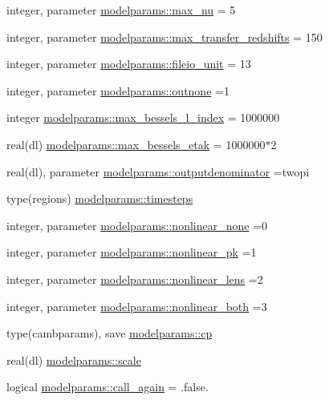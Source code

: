 \begin{DoxyCompactItemize}
\item 
integer, parameter \mbox{\hyperlink{namespacemodelparams_a5e3667fcd2aae0fb15654c207fc6830e}{modelparams\+::max\+\_\+nu}} = 5
\item 
integer, parameter \mbox{\hyperlink{namespacemodelparams_abe7b8d46cfb994afa85d77bbb5b6b5d5}{modelparams\+::max\+\_\+transfer\+\_\+redshifts}} = 150
\item 
integer, parameter \mbox{\hyperlink{namespacemodelparams_ac3257ef5df85ecef99f684ac5b101b71}{modelparams\+::fileio\+\_\+unit}} = 13
\item 
integer, parameter \mbox{\hyperlink{namespacemodelparams_a08fb4afbafc2828da55e9684f24d8d6f}{modelparams\+::outnone}} =1
\item 
integer \mbox{\hyperlink{namespacemodelparams_a0398b22cb85696d3eeaf76b7db97215c}{modelparams\+::max\+\_\+bessels\+\_\+l\+\_\+index}} = 1000000
\item 
real(dl) \mbox{\hyperlink{namespacemodelparams_a7a677586a4085c9c337cac0d8a025dc6}{modelparams\+::max\+\_\+bessels\+\_\+etak}} = 1000000$\ast$2
\item 
real(dl), parameter \mbox{\hyperlink{namespacemodelparams_abb77cb9ffb6e4c47f4bbb5817f675840}{modelparams\+::outputdenominator}} =twopi
\item 
type(regions) \mbox{\hyperlink{namespacemodelparams_ab62c122a08bce8a2c161066a3e0f83cd}{modelparams\+::timesteps}}
\item 
integer, parameter \mbox{\hyperlink{namespacemodelparams_a2e14a764fa10ffaa74cc53471510c99b}{modelparams\+::nonlinear\+\_\+none}} =0
\item 
integer, parameter \mbox{\hyperlink{namespacemodelparams_a7534d8ae818c3b810559177c3108c43c}{modelparams\+::nonlinear\+\_\+pk}} =1
\item 
integer, parameter \mbox{\hyperlink{namespacemodelparams_a0f2c57977e2bc614225a5776fbcd1efa}{modelparams\+::nonlinear\+\_\+lens}} =2
\item 
integer, parameter \mbox{\hyperlink{namespacemodelparams_a44142a84e66f3bd7d9feebe2abd22160}{modelparams\+::nonlinear\+\_\+both}} =3
\item 
type(cambparams), save \mbox{\hyperlink{namespacemodelparams_a957df29b9a56a2cfc2a8cb27d46daa2d}{modelparams\+::cp}}
\item 
real(dl) \mbox{\hyperlink{namespacemodelparams_adc3b09efaf8a6d37303ccd19e27ae6e3}{modelparams\+::scale}}
\item 
logical \mbox{\hyperlink{namespacemodelparams_a188f571d5f56be7a62bb3079ef44c3ce}{modelparams\+::call\+\_\+again}} = .false.

\end{DoxyCompactItemize}

